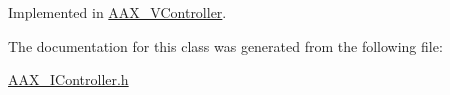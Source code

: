 Implemented in \mbox{\hyperlink{a01905_afc6f8557185c674951f9c4568a9a95b3}{A\+A\+X\+\_\+\+V\+Controller}}.



The documentation for this class was generated from the following file\+:\begin{DoxyCompactItemize}
\item 
\mbox{\hyperlink{a00575}{A\+A\+X\+\_\+\+I\+Controller.\+h}}\end{DoxyCompactItemize}

